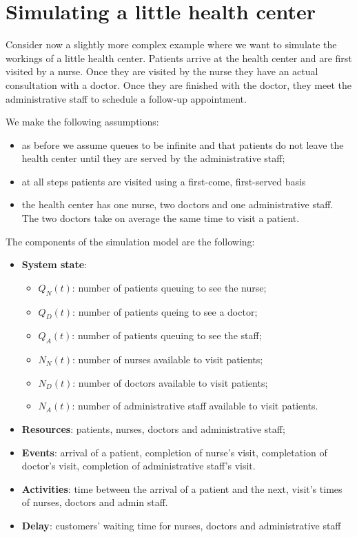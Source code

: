 \documentclass[
]{book}
\begin{document}
\hypertarget{simulating-a-little-health-center}{%
\section{Simulating a little health center}\label{simulating-a-little-health-center}}

Consider now a slightly more complex example where we want to simulate the workings of a little health center. Patients arrive at the health center and are first visited by a nurse. Once they are visited by the nurse they have an actual consultation with a doctor. Once they are finished with the doctor, they meet the administrative staff to schedule a follow-up appointment.

We make the following assumptions:

\begin{itemize}
\item
  as before we assume queues to be infinite and that patients do not leave the health center until they are served by the administrative staff;
\item
  at all steps patients are visited using a first-come, first-served basis
\item
  the health center has one nurse, two doctors and one administrative staff. The two doctors take on average the same time to visit a patient.
\end{itemize}

The components of the simulation model are the following:

\begin{itemize}
\item
  \textbf{System state}:

  \begin{itemize}
  \item
    \(Q_N(t)\): number of patients queuing to see the nurse;
  \item
    \(Q_D(t)\): number of patients queing to see a doctor;
  \item
    \(Q_A(t)\): number of patients queuing to see the staff;
  \item
    \(N_N(t)\): number of nurses available to visit patients;
  \item
    \(N_D(t)\): number of doctors available to visit patients;
  \item
    \(N_A(t)\): number of administrative staff available to visit patients.
  \end{itemize}
\item
  \textbf{Resources}: patients, nurses, doctors and administrative staff;
\item
  \textbf{Events}: arrival of a patient, completion of nurse's visit, completation of doctor's visit, completion of administrative staff's visit.
\item
  \textbf{Activities}: time between the arrival of a patient and the next, visit's times of nurses, doctors and admin staff.
\item
  \textbf{Delay}: customers' waiting time for nurses, doctors and administrative staff
\end{itemize}
\end{document}
